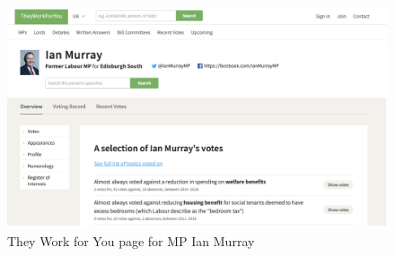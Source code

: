 \begin{figure}[h]
  \centering
  \includegraphics[scale=0.3]{images/they-work-for-you-ian-murray}
  \caption{They Work for You page for MP Ian Murray}
  \label{fig:they-work-for-you-ian-murray}
\end{figure}